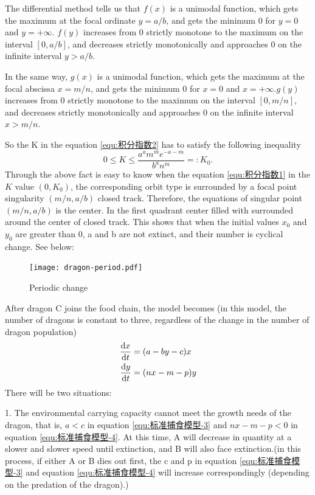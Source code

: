 The differential method tells us that $f(x)$ is a unimodal function, which gets the maximum at the focal ordinate $y=a/b$, and gets the minimum 0 for $y=0$ and $y=+\infty$. $f(y)$ increases from 0 strictly monotone to the maximum on the interval $[0, a/b]$, and decreases strictly monotonically and approaches 0 on the infinite interval $y>a/b$.

In the same way, $g(x)$ is a unimodal function, which gets the maximum at the focal abscissa $x=m/n$, and gets the minimum 0 for $x=0$ and $x=+\infty$.$g(y)$ increases from 0 strictly monotone to the maximum on the interval $[0, m/n]$, and decreases strictly monotonically and approaches 0 on the infinite interval $x>m/n$.

So the K in the equation \eqref{equ:积分指数2} has to satisfy the following inequality
    \begin{equation}\label{equ:不等式}
    0 \leq K \leq \frac{a^am^me^{-a-m}}{b^an^m} =: K_0.
    \end{equation}
Through the above fact is easy to know when the equation \eqref{equ:积分指数1} in the $K$ value $(0, K_0)$, the corresponding orbit type is surrounded by a focal point singularity $(m/n, a/b)$ closed track. Therefore, the equations of singular point $(m/n, a/b)$ is the center. In the first quadrant center filled with surrounded around the center of closed track. This shows that when the initial values $x_0$ and $y_0$ are greater than 0, a and b are not extinct, and their number is cyclical change. See below:
    \begin{figure}[ht]
        \centering
        \texttt{[image: dragon-period.pdf]}
        \caption{Periodic change}\label{e-fig:周期性变化}
    \end{figure}
After dragon C joins the food chain, the model becomes (in this model, the number of dragons is constant to three, regardless of the change in the number of dragon population)
\begin{align}
    \frac{\mathrm{d}x}{\mathrm{d}t} &= (a-by-c)x \label{equ:标准捕食模型-3} \\
    \frac{\mathrm{d}y}{\mathrm{d}t} &= (nx-m-p)y \label{equ:标准捕食模型-4}
    \end{align}
There will be two situations:

1. The environmental carrying capacity cannot meet the growth needs of the dragon, that is, $a<c$ in equation \eqref{equ:标准捕食模型-3} and $nx-m-p<0$ in equation \eqref{equ:标准捕食模型-4}. At this time, A will decrease in quantity at a slower and slower speed until extinction, and B will also face extinction.(in this process, if either A or B dies out first, the c and p in equation \eqref{equ:标准捕食模型-3} and equation \eqref{equ:标准捕食模型-4} will increase correspondingly (depending on the predation of the dragon).)

